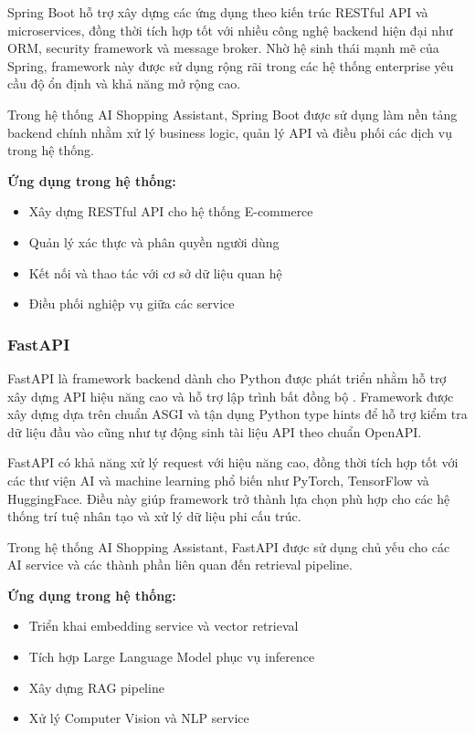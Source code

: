Spring Boot hỗ trợ xây dựng các ứng dụng theo kiến trúc RESTful API và microservices, đồng thời tích hợp tốt với nhiều công nghệ backend hiện đại như ORM, security framework và message broker. Nhờ hệ sinh thái mạnh mẽ của Spring, framework này được sử dụng rộng rãi trong các hệ thống enterprise yêu cầu độ ổn định và khả năng mở rộng cao.

Trong hệ thống AI Shopping Assistant, Spring Boot được sử dụng làm nền tảng backend chính nhằm xử lý business logic, quản lý API và điều phối các dịch vụ trong hệ thống.

\textbf{Ứng dụng trong hệ thống:}
\begin{itemize}
    \item Xây dựng RESTful API cho hệ thống E-commerce
    
    \item Quản lý xác thực và phân quyền người dùng
    
    \item Kết nối và thao tác với cơ sở dữ liệu quan hệ
    
    \item Điều phối nghiệp vụ giữa các service
\end{itemize}


\subsubsection{FastAPI}

FastAPI là framework backend dành cho Python được phát triển nhằm hỗ trợ xây dựng API hiệu năng cao và hỗ trợ lập trình bất đồng bộ \parencite{fastapidocs2024}. Framework được xây dựng dựa trên chuẩn ASGI và tận dụng Python type hints để hỗ trợ kiểm tra dữ liệu đầu vào cũng như tự động sinh tài liệu API theo chuẩn OpenAPI.

FastAPI có khả năng xử lý request với hiệu năng cao, đồng thời tích hợp tốt với các thư viện AI và machine learning phổ biến như PyTorch, TensorFlow và HuggingFace. Điều này giúp framework trở thành lựa chọn phù hợp cho các hệ thống trí tuệ nhân tạo và xử lý dữ liệu phi cấu trúc.

Trong hệ thống AI Shopping Assistant, FastAPI được sử dụng chủ yếu cho các AI service và các thành phần liên quan đến retrieval pipeline.

\textbf{Ứng dụng trong hệ thống:}
\begin{itemize}
    \item Triển khai embedding service và vector retrieval
    
    \item Tích hợp Large Language Model phục vụ inference
    
    \item Xây dựng RAG pipeline
    
    \item Xử lý Computer Vision và NLP service
\end{itemize}

